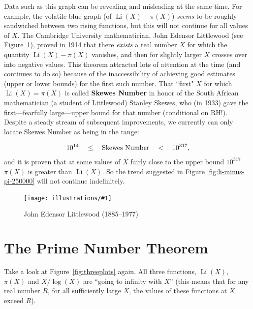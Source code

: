 \documentclass[openany]{book}
\DeclareMathOperator{\Li}{Li}
\newcommand{\ill}[3]{%
   \begin{figure}[H]%
   \vspace{-2ex}
   \centering%
   \texttt{[image: illustrations/\#1]}%
   \caption{#3}%
   \vspace{-2ex}
    \end{figure}}
\theoremstyle{plain}
\theoremstyle{definition}
\begin{document}
{%
Data such as this graph can be revealing and misleading at the same time.  For example, the volatile blue graph (of $\Li(X)-\pi(X)$) {\it seems} to be roughly sandwiched between two rising functions, but this will not continue for all values of $X$.  The Cambridge University mathematician, John Edensor Littlewood (see
Figure~\ref{fig:littlewood}), proved in 1914 that there {\it exists} a real number $X$ for which the quantity $\Li(X)-\pi(X)$ vanishes, and then for slightly larger $X$ crosses over into negative values.  This theorem attracted lots of attention at the time (and continues to do so) because of the inaccessibility of achieving good estimates (upper or lower bounds) for the first such number.  That ``first" $X$ for which   $\Li(X) =\pi(X)$ is called {\bf Skewes Number} in honor of the South African mathematician (a student of Littlewood)  Stanley Skewes, who (in 1933) gave the  first---fearfully large---upper bound for that number (conditional on RH!).  Despite a steady stream of subsequent improvements, we currently can only  locate Skewes Number  as being in the range:

$$
10^{14}\ \ \ \le\ \ \ {\rm Skewes\ Number}\ \ \ <\ \ \    10^{317},
$$ and it is proven that at some  values of $X$ fairly close to the upper bound $10^{317}$   $\pi(X)$ is greater than $\Li(X)$. So  the trend suggested in Figure \ref{fig:li-minus-pi-250000} will not continue indefinitely.


\ill{littlewood}{0.35}{John\index{Littlewood, John Edensor } Edensor Littlewood (1885--1977)\label{fig:littlewood}}




\chapter{The Prime Number Theorem\label{sec:pnt}}

Take a look at Figure~\ref{fig:threeplots} again.
All three functions, $\Li(X)$, $\pi(X)$ and $X/\log(X)$
are ``going to infinity with $X$'' (this means
that for any real number $R$, for all sufficiently large $X$,
the values of these functions at $X$ exceed $R$).

}
\end{document}
